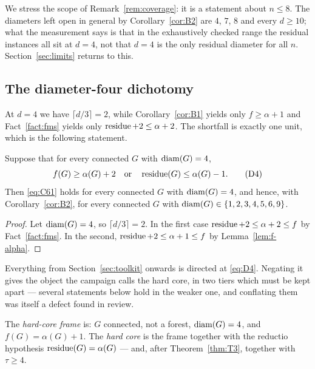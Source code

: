 We stress the scope of Remark~\ref{rem:coverage}: it is a statement about $n \le 8$. The
diameters left open in general by Corollary~\ref{cor:B2} are $4$, $7$, $8$ and every
$d \ge 10$; what the measurement says is that in the exhaustively checked range the
residual instances all sit at $d = 4$, not that $d = 4$ is the only residual diameter for
all $n$. Section~\ref{sec:limits} returns to this.

\subsection{The diameter-four dichotomy}\label{sec:dichotomy}

At $d = 4$ we have $\lceil d/3 \rceil = 2$, while Corollary~\ref{cor:B1} yields only
$f \ge \alpha + 1$ and Fact~\ref{fact:fms} yields only $\operatorname{residue} + 2 \le \alpha + 2$. The
shortfall is exactly one unit, which is the following statement.

\begin{proposition}[the $d=4$ dichotomy]\label{prop:dichotomy}
\Selem
Suppose that for every connected $G$ with $\operatorname{diam}(G) = 4$,
\begin{equation}\label{eq:D4}
f(G) \ge \alpha(G) + 2 \quad\text{or}\quad \operatorname{residue}(G) \le \alpha(G) - 1.
\tag{D4}
\end{equation}
Then \eqref{eq:C61} holds for every connected $G$ with $\operatorname{diam}(G) = 4$, and hence, with
Corollary~\ref{cor:B2}, for every connected $G$ with
$\operatorname{diam}(G) \in \{1,2,3,4,5,6,9\}$.
\end{proposition}

\begin{proof}
Let $\operatorname{diam}(G) = 4$, so $\lceil d/3 \rceil = 2$. In the first case
$\operatorname{residue} + 2 \le \alpha + 2 \le f$ by Fact~\ref{fact:fms}. In the second,
$\operatorname{residue} + 2 \le \alpha + 1 \le f$ by Lemma~\ref{lem:f-alpha}.
\end{proof}

Everything from Section~\ref{sec:toolkit} onwards is directed at \eqref{eq:D4}. Negating it
gives the object the campaign calls the hard core, in two tiers which must be kept apart ---
several statements below hold in the weaker one, and conflating them was itself a defect
found in review.

\begin{definition}\label{def:frame}
The \emph{hard-core frame} is: $G$ connected, not a forest, $\operatorname{diam}(G) = 4$, and
$f(G) = \alpha(G) + 1$. The \emph{hard core} is the frame together with the reductio
hypothesis $\operatorname{residue}(G) = \alpha(G)$ --- and, after Theorem~\ref{thm:T3}, together with
$\tau \ge 4$.
\end{definition}

